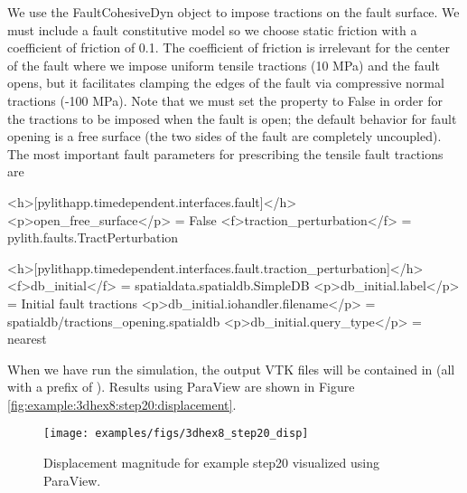 We use the FaultCohesiveDyn object to impose tractions on the fault
surface. We must include a fault constitutive model so we choose static
friction with a coefficient of friction of 0.1. The coefficient of
friction is irrelevant for the center of the fault where we impose
uniform tensile tractions (10 MPa) and the fault opens, but it facilitates
clamping the edges of the fault via compressive normal tractions (-100
MPa). Note that we must set the property 
to False in order for the tractions to be imposed when the fault is
open; the default behavior for fault opening is a free surface (the
two sides of the fault are completely uncoupled). The most important
fault parameters for prescribing the tensile fault tractions are
\begin{cfg}
<h>[pylithapp.timedependent.interfaces.fault]</h>
<p>open_free_surface</p> = False
<f>traction_perturbation</f> = pylith.faults.TractPerturbation

<h>[pylithapp.timedependent.interfaces.fault.traction_perturbation]</h>
<f>db_initial</f> = spatialdata.spatialdb.SimpleDB
<p>db_initial.label</p> = Initial fault tractions
<p>db_initial.iohandler.filename</p> = spatialdb/tractions_opening.spatialdb
<p>db_initial.query_type</p> = nearest 
\end{cfg}
When we have run the simulation, the output VTK files will be contained
in  (all with a prefix of ).
Results using ParaView are shown in Figure \vref{fig:example:3dhex8:step20:displacement}.

\begin{figure}
  \texttt{[image: examples/figs/3dhex8\_step20\_disp]}
  \caption{Displacement magnitude for example step20 visualized using ParaView.}
  \label{fig:example:3dhex8:step20:displacement}
\end{figure}


